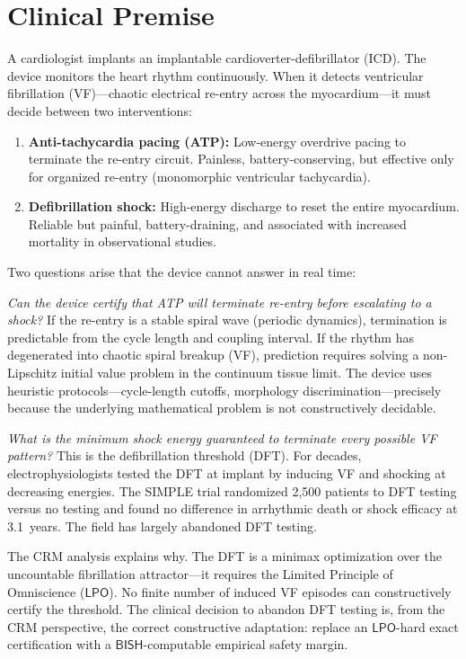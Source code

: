 \documentclass[11pt,a4paper]{article}
\theoremstyle{plain}
\theoremstyle{definition}
\newcommand{\BISH}{\textsf{BISH}}
\newcommand{\LPO}{\textsf{LPO}}
\begin{document}
\section{Clinical Premise}\label{sec:premise}

A cardiologist implants an implantable cardioverter-defibrillator (ICD).  The device monitors the heart rhythm continuously.  When it detects ventricular fibrillation (VF)---chaotic electrical re-entry across the myocardium---it must decide between two interventions:

\begin{enumerate}[nosep]
\item \textbf{Anti-tachycardia pacing (ATP):} Low-energy overdrive pacing to terminate the re-entry circuit.  Painless, battery-conserving, but effective only for organized re-entry (monomorphic ventricular tachycardia).
\item \textbf{Defibrillation shock:} High-energy discharge to reset the entire myocardium.  Reliable but painful, battery-draining, and associated with increased mortality in observational studies.
\end{enumerate}

Two questions arise that the device cannot answer in real time:

\textit{Can the device certify that ATP will terminate re-entry before escalating to a shock?}  If the re-entry is a stable spiral wave (periodic dynamics), termination is predictable from the cycle length and coupling interval.  If the rhythm has degenerated into chaotic spiral breakup (VF), prediction requires solving a non-Lipschitz initial value problem in the continuum tissue limit.  The device uses heuristic protocols---cycle-length cutoffs, morphology discrimination---precisely because the underlying mathematical problem is not constructively decidable.

\textit{What is the minimum shock energy guaranteed to terminate every possible VF pattern?}  This is the defibrillation threshold (DFT).  For decades, electrophysiologists tested the DFT at implant by inducing VF and shocking at decreasing energies.  The SIMPLE trial \cite{simple2013} randomized 2,500 patients to DFT testing versus no testing and found no difference in arrhythmic death or shock efficacy at 3.1~years.  The field has largely abandoned DFT testing.

The CRM analysis explains why.  The DFT is a minimax optimization over the uncountable fibrillation attractor---it requires the Limited Principle of Omniscience ($\LPO$).  No finite number of induced VF episodes can constructively certify the threshold.  The clinical decision to abandon DFT testing is, from the CRM perspective, the correct constructive adaptation: replace an $\LPO$-hard exact certification with a $\BISH$-computable empirical safety margin.
\end{document}
